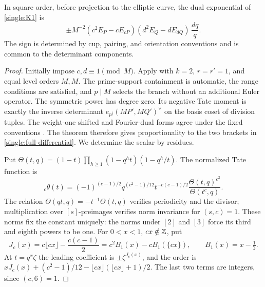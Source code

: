 \begin{lemma}\label{single:kato-calibration}
In square order, before projection to the elliptic curve, the dual
exponential of \eqref{single:K1} is
\begin{equation}\label{single:full-differential}
 \pm M^{-2}(c^2E_P-cE_{cP})(d^2E_Q-dE_{dQ})\,\frac{dq}{q}.
\end{equation}
The sign is determined by cup, pairing, and orientation conventions
and is common to the determinant components.
\end{lemma}
\begin{proof}
Initially impose \(c,d\equiv1\pmod M\).  Apply
\cite[Theorem~9.5]{Kato} with \(k=2\), \(r=r'=1\), and equal level
orders \(M,M\).  The prime-support containment is automatic, the
range conditions are satisfied, and \(p\mid M\) selects the branch
without an additional Euler operator.  The symmetric power has degree
zero.  Its negative Tate moment is exactly the inverse determinant
\(e_{p^j}(MP',MQ')^\vee\) on the basis coset of division tuples.
The weight-one shifted and Fourier-dual forms agree under the fixed
conventions \cite[Proposition~3.11(1) and Section~4.2]{Kato}.
The theorem therefore gives proportionality to the two brackets in
\eqref{single:full-differential}.  We determine the scalar by residues.

Put \(\Theta(t,q)=(1-t)\prod_{h\geq1}(1-q^ht)(1-q^h/t)\).
The normalized Tate function is
\[
 {}_c\theta(t)=(-1)^{(c-1)/2}q^{(c^2-1)/12}t^{-c(c-1)/2}
                 \frac{\Theta(t,q)^{c^2}}{\Theta(t^c,q)}.
\]
The relation \(\Theta(qt,q)=-t^{-1}\Theta(t,q)\) verifies periodicity
and the divisor; multiplication over \([s]\)-preimages verifies norm
invariance for \((s,c)=1\).  These norms fix the constant uniquely:
the norms under \([2]\) and \([3]\) force its third and eighth powers
to be one.  For \(0<x<1\), \(cx\notin\mathbb Z\), put
\[
 J_c(x)=c\lfloor cx\rfloor-\frac{c(c-1)}2
       =c^2B_1(x)-cB_1(\{cx\}),\qquad B_1(x)=x-\tfrac12.
\]
At \(t=q^x\zeta\) the leading coefficient is
\(\pm\zeta^{J_c(x)}\), and the order is
\(xJ_c(x)+(c^2-1)/12-\lfloor cx\rfloor(\lfloor cx\rfloor+1)/2\).
The last two terms are integers, since \((c,6)=1\).


\end{proof}
